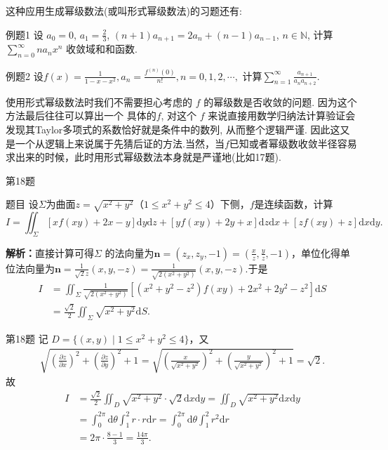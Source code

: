 \documentclass[aspectratio=169]{beamer}
\begin{document}
\begin{frame}
这种应用生成幂级数法(或叫形式幂级数法)的习题还有:
\begin{block}{例题1}
设 $a_0 = 0$, $a_1 = \frac{2}{3}$, $(n + 1)a_{n+1} = 2a_n + (n - 1)a_{n-1}$, $n \in \mathbb{N}$, 计算 $\sum_{n=0}^{\infty} n a_n x^n$ 收敛域和和函数.
\end{block}
\begin{block}{例题2}
设$f(x)=\frac{1}{1 - x - x^2}, a_n=\frac{f^{(n)}(0)}{n!}, n = 0,1,2,\cdots,$
计算$\sum_{n = 1}^{\infty}\frac{a_{n + 1}}{a_n a_{n + 2}}.$
\end{block}
使用形式幂级数法时我们不需要担心考虑的 \( f \) 的幂级数是否收敛的问题. 因为这个方法最后往往可以算出一个 具体的\( f \), 对这个 \( f \) 来说直接用数学归纳法计算验证会发现其Taylor多项式的系数恰好就是条件中的数列, 从而整个逻辑严谨. 因此这又是一个从逻辑上来说属于先猜后证的方法.当然，当$f$已知或者幂级数收敛半径容易求出来的时候，此时用形式幂级数法本身就是严谨地(比如17题).
\end{frame}

\begin{frame}{第18题}
\begin{block}{题目}
设$\Sigma$为曲面$z=\sqrt{x^2+y^2}$（$1\leqslant x^2+y^2\leqslant 4$）下侧，$f$是连续函数，计算
\[
I=\iint_\Sigma [xf(xy)+2x-y]\mathrm{d}y\mathrm{d}z
+[yf(xy)+2y+x]\mathrm{d}z\mathrm{d}x
+[zf(xy)+z]\mathrm{d}x\mathrm{d}y.
\]
\end{block}
\textbf{解析：}直接计算可得$\Sigma$ 的法向量为$\boldsymbol{n}=\left( z_x,z_y,-1 \right) =\left( \frac{x}{z},\frac{y}{z},-1 \right) $，单位化得单位法向量为$\boldsymbol{n}=\frac{1}{\sqrt{2}z}\left( x,y,-z \right) =\frac{1}{\sqrt{2(x^2+y^2)}}\left( x,y,-z \right)$.于是
\begin{align*}
I &= \iint_\Sigma \frac{1}{\sqrt{2(x^2+y^2)}} \left[(x^2+y^2-z^2)f(xy)+2x^2+2y^2-z^2\right] \mathrm{d}S \\
&= \frac{\sqrt{2}}{2} \iint_\Sigma \sqrt{x^2+y^2} \mathrm{d}S.
\end{align*}
\end{frame}

\begin{frame}{第18题}
记 $D=\{(x,y)\mid 1\leqslant x^2+y^2\leqslant 4\}$，又
\begin{align*}
\sqrt{\left(\frac{\partial z}{\partial x}\right)^2+\left(\frac{\partial z}{\partial y}\right)^2+1}
= \sqrt{\left(\frac{x}{\sqrt{x^2+y^2}}\right)^2+\left(\frac{y}{\sqrt{x^2+y^2}}\right)^2+1}
= \sqrt{2}.
\end{align*}
故
\begin{align*}
I&=\frac{\sqrt{2}}{2}\iint_D{\sqrt{x^2+y^2}}\cdot \sqrt{2}\mathrm{d}x\mathrm{d}y=\iint_D{\sqrt{x^2+y^2}\mathrm{d}x\mathrm{d}y}
\\
&=\int_0^{2\pi}{\mathrm{d}\theta \int_1^2{r}}\cdot r\mathrm{d}r=\int_0^{2\pi}{\mathrm{d}\theta \int_1^2{r^2\mathrm{d}r}}
\\
&=2\pi \cdot \frac{8-1}{3}=\frac{14\pi}{3}.
\end{align*}
\end{frame}
\end{document}
